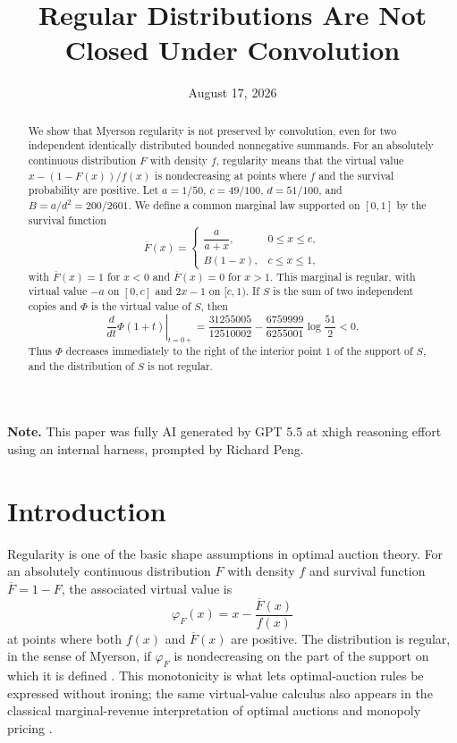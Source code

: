 \documentclass[11pt]{article}
\title{Regular Distributions Are Not Closed Under Convolution}
\author{}
\date{August 17, 2026}
\begin{document}

\maketitle

\begin{abstract}
We show that Myerson regularity is not preserved by convolution, even for two
independent identically distributed bounded nonnegative summands.  For an
absolutely continuous distribution $F$ with density $f$, regularity means that
the virtual value $x-(1-F(x))/f(x)$ is nondecreasing at points where $f$ and the
survival probability are positive.  Let
$a=1/50$, $c=49/100$, $d=51/100$, and $B=a/d^2=200/2601$.  We define a common
marginal law supported on $[0,1]$ by the survival function
\[
\overline F(x)=
\begin{cases}
\dfrac{a}{a+x}, & 0 \leq x \leq c,\\[6pt]
B(1-x), & c \leq x \leq 1,
\end{cases}
\]
with $\overline F(x)=1$ for $x<0$ and $\overline F(x)=0$ for $x>1$.  This
marginal is regular, with virtual value $-a$ on $[0,c]$ and $2x-1$ on
$[c,1)$.  If $S$ is the sum of two independent copies and $\Phi$ is the virtual
value of $S$, then
\[
\left.\frac{d}{dt}\Phi(1+t)\right|_{t=0+}
=
\frac{31255005}{12510002}
-\frac{6759999}{6255001}\log\frac{51}{2}
<0.
\]
Thus $\Phi$ decreases immediately to the right of the interior point $1$ of the
support of $S$, and the distribution of $S$ is not regular.
\end{abstract}

\noindent\textbf{Note.} This paper was fully AI generated by GPT 5.5 at xhigh reasoning effort using an internal harness, prompted by Richard Peng.\par



\clearpage
\tableofcontents
\clearpage


\section{Introduction}
\label{sec:introduction}

Regularity is one of the basic shape assumptions in optimal auction theory.
For an absolutely continuous distribution $F$ with density $f$ and survival
function $\overline F=1-F$, the associated virtual value is
\[
\varphi_F(x)=x-\frac{\overline F(x)}{f(x)}
\]
at points where both $f(x)$ and $\overline F(x)$ are positive.  The
distribution is regular, in the sense of Myerson, if $\varphi_F$ is
nondecreasing on the part of the support on which it is defined
\cite{Myerson1981OptimalAuction}.  This
monotonicity is what lets optimal-auction rules be expressed without ironing;
the same virtual-value calculus also appears in the classical marginal-revenue
interpretation of optimal auctions and monopoly pricing
\cite{RileySamuelson1981OptimalAuctions,BulowRoberts1989SimpleEconomics}.
\end{document}
